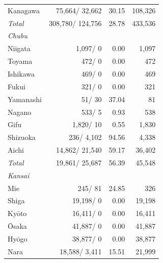 \documentclass[
  letterpaper,
  DIV=11,
  numbers=noendperiod]{scrartcl}
\begin{document}
\begin{table}[htbp]
\begin{tabular}{lrrr}
\hspace{1em}Kanagawa    & 75,664/ 32,662& 30.15 & 108,326 \\
\hspace{1em}\textit{Total}       & 308,780/ 124,756& 28.78& 433,536 \\
\addlinespace
\textit{Chubu} & & & \\
\hspace{1em}Niigata     & 1,097/ 0      & 0.00  & 1,097   \\
\hspace{1em}Toyama      & 472/ 0        & 0.00  & 472     \\
\hspace{1em}Ishikawa    & 469/ 0        & 0.00  & 469     \\
\hspace{1em}Fukui       & 321/ 0        & 0.00  & 321     \\
\hspace{1em}Yamanashi   & 51/ 30        & 37.04 & 81      \\
\hspace{1em}Nagano      & 533/ 5        & 0.93  & 538     \\
\hspace{1em}Gifu        & 1,820/ 10     & 0.55  & 1,830   \\
\hspace{1em}Shizuoka    & 236/ 4,102    & 94.56 & 4,338   \\
\hspace{1em}Aichi       & 14,862/ 21,540& 59.17 & 36,402  \\
\hspace{1em}\textit{Total}       & 19,861/ 25,687& 56.39 & 45,548  \\
\addlinespace
\textit{Kansai} & & & \\
\hspace{1em}Mie         & 245/ 81       & 24.85 & 326     \\
\hspace{1em}Shiga       & 19,198/ 0     & 0.00  & 19,198  \\
\hspace{1em}Kyōto       & 16,411/ 0     & 0.00  & 16,411  \\
\hspace{1em}Ōsaka       & 41,887/ 0     & 0.00  & 41,887  \\
\hspace{1em}Hyōgo       & 38,877/ 0     & 0.00  & 38,877  \\
\hspace{1em}Nara        & 18,588/ 3,411 & 15.51 & 21,999  \\

\end{tabular}
\end{table}
\end{document}

